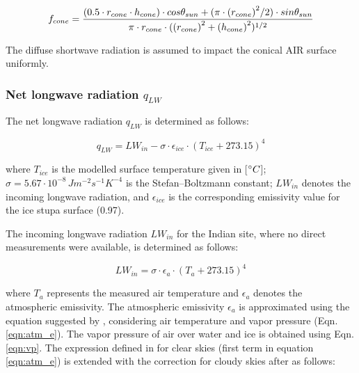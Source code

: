 \begin{equation}
	\begin{split}
		f_{cone}& =\frac{(0.5 \cdot r_{cone} \cdot h_{cone}) \cdot cos \theta_{sun} +(\pi \cdot
		{(r_{cone})}^2/2) \cdot sin \theta_{sun} }{\pi \cdot r_{cone} \cdot ({(r_{cone})}^2+{(h_{cone})}^2)^{1/2}}\\
	\end{split}
	\label{eqn:f_{cone} }
\end{equation}

The diffuse shortwave radiation is assumed to impact the conical AIR surface uniformly.

\subsubsection{Net longwave radiation \texorpdfstring{$q_{LW}$}{Lg}} \label{sec:LW}

The net longwave radiation $q_{LW}$ is determined as follows:

\begin{equation}
	q_{LW}= LW_{in}-\sigma \cdot \epsilon_{ice} \cdot {(T_{ice}+ 273.15)}^4
	\label{eqn:LW}
\end{equation}

where $T_{ice}$ is the modelled surface temperature given in [$^{\circ} C$];
$\sigma=5.67\cdot10^{-8}\,Jm^{-2}s^{-1}K^{-4}$ is the Stefan–Boltzmann constant; $LW_{in}$ denotes the incoming
longwave radiation, and $\epsilon_{ice}$ is the corresponding emissivity value for the ice stupa surface (0.97).

The incoming longwave radiation $LW_{in}$ for the Indian site, where no direct measurements were available, is
determined as follows:

\begin{equation}
	LW_{in}=\sigma \cdot \epsilon_a \cdot {(T_a+ 273.15)}^4
	\label{eqn:LWin}
\end{equation}

where $T_a$ represents the measured air temperature and $\epsilon_a$ denotes the atmospheric emissivity. The atmospheric emissivity $\epsilon_a$ is approximated using the equation suggested by \cite{brutsaertEvaporationAtmosphereTheory1982},
considering air temperature and vapor pressure (Eqn.  \ref{eqn:atm_e}). The vapor pressure of air over water and
ice is obtained using Eqn. \ref{eqn:vp}.  The expression defined in \cite{brutsaertDerivableFormulaLongwave1975} for clear skies
(first term in equation \ref{eqn:atm_e}) is extended with the correction for cloudy skies after
\cite{brutsaertEvaporationAtmosphereTheory1982} as follows:

